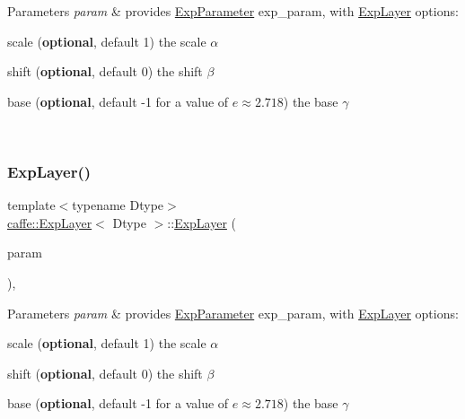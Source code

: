 \begin{DoxyParams}{Parameters}
{\em param} & provides \mbox{\hyperlink{classcaffe_1_1_exp_parameter}{Exp\+Parameter}} exp\+\_\+param, with \mbox{\hyperlink{classcaffe_1_1_exp_layer}{Exp\+Layer}} options\+:
\begin{DoxyItemize}
\item scale ({\bfseries optional}, default 1) the scale $ \alpha $
\item shift ({\bfseries optional}, default 0) the shift $ \beta $
\item base ({\bfseries optional}, default -\/1 for a value of $ e \approx 2.718 $) the base $ \gamma $ 
\end{DoxyItemize}\\
\hline
\end{DoxyParams}
\mbox{\label{classcaffe_1_1_exp_layer_a87a0fae261ad3d2c8947f463686a6de0}} 
\subsubsection{\texorpdfstring{Exp\+Layer()}{ExpLayer()}\hspace{0.1cm}{\footnotesize\ttfamily [2/2]}}
{\footnotesize\ttfamily template$<$typename Dtype$>$ \\
\mbox{\hyperlink{classcaffe_1_1_exp_layer}{caffe\+::\+Exp\+Layer}}$<$ Dtype $>$\+::\mbox{\hyperlink{classcaffe_1_1_exp_layer}{Exp\+Layer}} (\begin{DoxyParamCaption}\item[{const \mbox{\hyperlink{classcaffe_1_1_layer_parameter}{Layer\+Parameter}} \&}]{param }\end{DoxyParamCaption})\hspace{0.3cm}{\ttfamily [inline]}, {\ttfamily [explicit]}}


\begin{DoxyParams}{Parameters}
{\em param} & provides \mbox{\hyperlink{classcaffe_1_1_exp_parameter}{Exp\+Parameter}} exp\+\_\+param, with \mbox{\hyperlink{classcaffe_1_1_exp_layer}{Exp\+Layer}} options\+:
\begin{DoxyItemize}
\item scale ({\bfseries optional}, default 1) the scale $ \alpha $
\item shift ({\bfseries optional}, default 0) the shift $ \beta $
\item base ({\bfseries optional}, default -\/1 for a value of $ e \approx 2.718 $) the base $ \gamma $ 
\end{DoxyItemize}\\
\hline
\end{DoxyParams}


